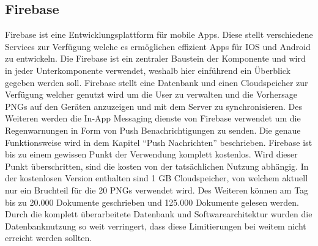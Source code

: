 \subsection{Firebase}\label{firebase}
Firebase ist eine Entwicklungsplattform für mobile Apps. 
Diese stellt verschiedene Services zur Verfügung welche es ermöglichen effizient Apps für IOS und Android zu entwickeln. 
Die Firebase ist ein zentraler Baustein der Komponente und wird in jeder Unterkomponente verwendet, weshalb hier einführend 
ein Überblick gegeben werden soll. 
Firebase stellt eine Datenbank und einen Cloudspeicher zur Verfügung welcher genutzt wird um die User zu verwalten und die 
Vorhersage PNGs auf den Geräten anzuzeigen und mit dem Server zu synchronisieren. 
Des Weiteren werden die In-App Messaging dienste von Firebase verwendet um die Regenwarnungen in Form von Push Benachrichtigungen zu senden. 
Die genaue Funktionsweise wird in dem Kapitel “Push Nachrichten” beschrieben.   
Firebase ist bis zu einem gewissen Punkt der Verwendung komplett kostenlos. 
Wird dieser Punkt überschritten, sind die kosten von der tatsächlichen Nutzung abhängig. 
In der kostenlosen Version enthalten sind 1 GB Cloudspeicher, von welchem aktuell nur ein Bruchteil für die 20 PNGs 
verwendet wird. Des Weiteren können am Tag bis zu 20.000 Dokumente geschrieben und 125.000 Dokumente gelesen werden. 
Durch die komplett überarbeitete Datenbank und Softwarearchitektur wurden die Datenbanknutzung so weit verringert, 
dass diese Limitierungen bei weitem nicht erreicht werden sollten. 